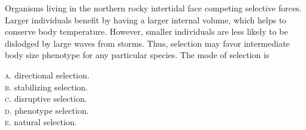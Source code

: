 \documentclass[letterpaper]{tufte-handout}
\begin{document}
\bigskip

\noindent Organisms living in the northern rocky intertidal face competing selective forces. Larger individuals benefit by having a larger internal volume, which helps to conserve body temperature. However, smaller individuals are less likely to be dislodged by large waves from storms. Thus, selection may favor intermediate body size phenotype for any particular species. The mode of selection is

\smallskip

\textsc{a}. directional selection.\\
\textsc{b}. stabilizing selection. \\
\textsc{c}. disruptive selection. \\
\textsc{d}. phenotype selection. \\
\textsc{e}. natural selection.
\end{document}
